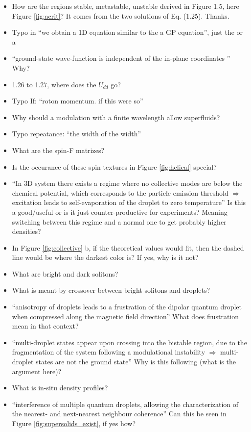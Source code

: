 \begin{itemize}
        \item How are the regions stable, metastable, unstable derived in Figure 1.5, here Figure \ref{fig:acrit}? 
        {\color{red}
            It comes from the two solutions of Eq. (1.25).
        }
        {\color{green}
            Thanks.
        }

\end{itemize}

\begin{itemize}
        \item Typo in ``we obtain a 1D equation similar to the a GP equation'', just the or a
        \item ``ground-state wave-function is independent of the in-plane coordinates '' Why?
        \item 1.26 to 1.27, where does the $U_{dd}$ go?
        \item Typo If: ``roton momentum. if this were so''
        \item Why should a modulation with a finite wavelength allow superfluids?
        \item Typo repeatance: ``the width of the width''
        \item What are the spin-F matrizes?
        \item Is the occurance of these spin textures in Figure \ref{fig:helical} special?
        \item ``In 3D system there exists a regime where no collective modes are below the chemical potential, which corresponds to the particle emission threshold $\Rightarrow$ excitation leads to self-evaporation of the droplet to zero temperature'' Is this a good/useful or is it just counter-productive for experiments? Meaning switching between this regime and a normal one to get probably higher densities?
        \item In Figure \ref{fig:collective} b, if the theoretical values would fit, then the dashed line would be where the darkest color is? If yes, why is it not?
        \item What are bright and dark solitons?
        \item What is meant by crossover between bright solitons and droplets?
        \item ``anisotropy of droplets leads to a frustration of the dipolar quantum droplet when
compressed along the magnetic field direction'' What does frustration mean in that context?
        \item ``multi-droplet states appear upon crossing into the bistable region, due to the fragmentation of the system following a modulational instability $\Rightarrow$ multi-droplet states are not the ground state'' Why is this following (what is the argument here)?
        \item What is in-situ density profiles?
        \item ``interference of multiple quantum droplets, allowing the characterization of the nearest- and next-nearest neighbour coherence'' Can this be seen in Figure \ref{fig:supersolids_exist}, if yes how?

\end{itemize}


